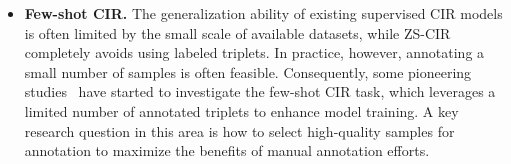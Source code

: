 \begin{itemize}
   \item \textbf{Few-shot CIR.} The generalization ability of existing supervised CIR models is often limited by the small scale of available datasets, while ZS-CIR completely avoids using labeled triplets. In practice, however, annotating a small number of samples is often feasible. Consequently, some pioneering studies~\cite{wu2023few,hou2024pseudo} have started to investigate the few-shot CIR task, which leverages a limited number of annotated triplets to enhance model training. A key research question in this area is how to select high-quality samples for annotation to maximize the benefits of manual annotation efforts.


\end{itemize}



